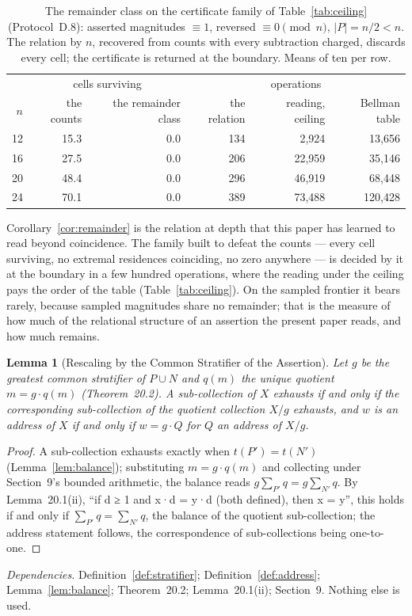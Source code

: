 \documentclass[pdflatex,sn-mathphys-num]{sn-jnl}
\theoremstyle{thmstyleone}%
\newtheorem{lemma}[theorem]{Lemma}
\theoremstyle{thmstyletwo}%
\theoremstyle{thmstylethree}%
\newtheorem{lemma}[theorem]{Lemma}
\newcommand{\q}[1]{``#1''}        %
\newcommand{\deps}[1]{\par\begin{sloppypar}\noindent\emph{Dependencies.} #1 Nothing else is used.\end{sloppypar}}
\begin{document}
\begin{table}[!htbp]
\centering\small
\caption{The remainder class on the certificate family of Table~\ref{tab:ceiling} (Protocol~D.8): asserted magnitudes $\equiv1$, reversed $\equiv0 \pmod n$, $|P|=n/2<n$. The relation by $n$, recovered from counts with every subtraction charged, discards every cell; the certificate is returned at the boundary. Means of ten per row.}
\label{tab:remainder}
\setlength{\tabcolsep}{4pt}
\begin{tabular}{rrrrrr}
\toprule
 & \multicolumn{2}{c}{cells surviving} & \multicolumn{3}{c}{operations} \\
$n$ & the counts & the remainder class & the relation & reading, ceiling & Bellman table \\
\midrule
12 & 15.3 & 0.0 & 134 & 2,924 & 13,656 \\
16 & 27.5 & 0.0 & 206 & 22,959 & 35,146 \\
20 & 48.4 & 0.0 & 296 & 46,919 & 68,448 \\
24 & 70.1 & 0.0 & 389 & 73,488 & 120,428 \\
\bottomrule
\end{tabular}
\end{table}

\noindent Corollary~\ref{cor:remainder} is the relation at depth that this paper has learned to read beyond coincidence. The family built to defeat the counts --- every cell surviving, no extremal residences coinciding, no zero anywhere --- is decided by it at the boundary in a few hundred operations, where the reading under the ceiling pays the order of the table (Table~\ref{tab:ceiling}). On the sampled frontier it bears rarely, because sampled magnitudes share no remainder; that is the measure of how much of the relational structure of an assertion the present paper reads, and how much remains.

\begin{lemma}[Rescaling by the Common Stratifier of the Assertion]\label{lem:rescale}
Let $g$ be the greatest common stratifier of $P\cup N$ and $q(m)$ the unique quotient $m=g\cdot q(m)$ (Theorem~20.2). A sub-collection of $X$ exhausts if and only if the corresponding sub-collection of the quotient collection $X/g$ exhausts, and $w$ is an address of $X$ if and only if $w=g\cdot Q$ for $Q$ an address of $X/g$.
\end{lemma}
\begin{proof}
A sub-collection exhausts exactly when $t(P')=t(N')$ (Lemma~\ref{lem:balance}); substituting $m=g\cdot q(m)$ and collecting under Section~9's bounded arithmetic, the balance reads $g\sum_{P'}q=g\sum_{N'}q$. By Lemma~20.1(ii), \q{if d ≥ 1 and x·d = y·d (both defined), then x = y}, this holds if and only if $\sum_{P'}q=\sum_{N'}q$, the balance of the quotient sub-collection; the address statement follows, the correspondence of sub-collections being one-to-one.
\end{proof}
\deps{Definition~\ref{def:stratifier}; Definition~\ref{def:address}; Lemma~\ref{lem:balance}; Theorem~20.2; Lemma~20.1(ii); Section~9.}
\end{document}
